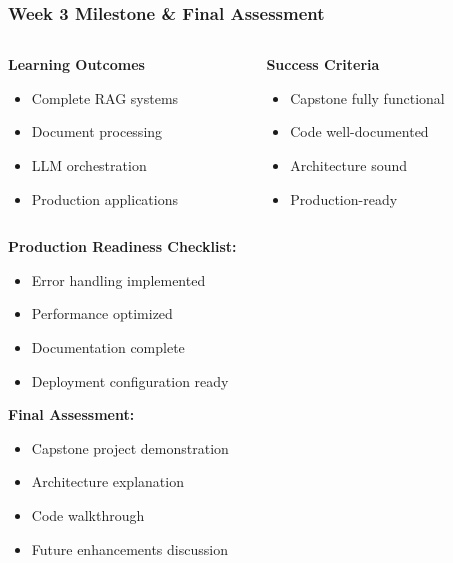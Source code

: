 \begin{frame}[fragile]\frametitle{Week 3 Milestone \& Final Assessment}
\begin{columns}
    \begin{column}[T]{0.5\linewidth}
      \textbf{Learning Outcomes}
      \begin{itemize}
        \item Complete RAG systems
        \item Document processing
        \item LLM orchestration
        \item Production applications
      \end{itemize}
    \end{column}
    \begin{column}[T]{0.5\linewidth}
      \textbf{Success Criteria}
      \begin{itemize}
        \item Capstone fully functional
        \item Code well-documented
        \item Architecture sound
        \item Production-ready
      \end{itemize}
    \end{column}
  \end{columns}
  
\textbf{Production Readiness Checklist:}
\begin{itemize}
  \item Error handling implemented
  \item Performance optimized
  \item Documentation complete
  \item Deployment configuration ready
\end{itemize}
  
  \vspace{0.3cm}
  \textbf{Final Assessment:}
  \begin{itemize}
    \item Capstone project demonstration
    \item Architecture explanation
    \item Code walkthrough
    \item Future enhancements discussion
  \end{itemize}
\end{frame}

